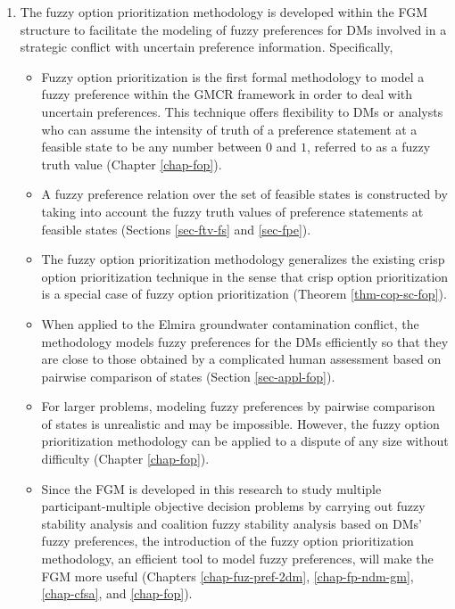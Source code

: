 \begin{enumerate}
\item The fuzzy option prioritization methodology is developed within the FGM structure to facilitate the modeling of fuzzy preferences for DMs involved in a strategic conflict with uncertain preference information. Specifically,
  \begin{itemize}
    \item Fuzzy option prioritization is the first formal methodology to model a fuzzy preference within the GMCR framework in order to deal with uncertain preferences. This technique offers flexibility to DMs or analysts who can assume the intensity of truth of a preference statement at a feasible state to be any number between $0$ and $1$, referred to as a fuzzy truth value (Chapter \ref{chap-fop}).
    \item A fuzzy preference relation over the set of feasible states is constructed by taking into account the fuzzy truth values of preference statements at feasible states (Sections \ref{sec-ftv-fs} and \ref{sec-fpe}).
    \item The fuzzy option prioritization methodology generalizes the existing crisp option prioritization technique in the sense that crisp option prioritization is a special case of fuzzy option prioritization (Theorem \ref{thm-cop-sc-fop}).
    \item When applied to the Elmira groundwater contamination conflict, the methodology models fuzzy preferences for the DMs efficiently so that they are close to those obtained by a complicated human assessment based on pairwise comparison of states (Section \ref{sec-appl-fop}).
    \item For larger problems, modeling fuzzy preferences by pairwise comparison of states is unrealistic and may be impossible. However, the fuzzy option prioritization methodology can be applied to a dispute of any size without difficulty (Chapter \ref{chap-fop}).
    \item Since the FGM is developed in this research to study multiple participant-multiple objective decision problems by carrying out fuzzy stability analysis and coalition fuzzy stability analysis based on DMs' fuzzy preferences, the introduction of the fuzzy option prioritization methodology, an efficient tool to model fuzzy preferences, will make the FGM more useful (Chapters \ref{chap-fuz-pref-2dm}, \ref{chap-fp-ndm-gm}, \ref{chap-cfsa}, and \ref{chap-fop}).
\end{itemize}
\end{enumerate}

